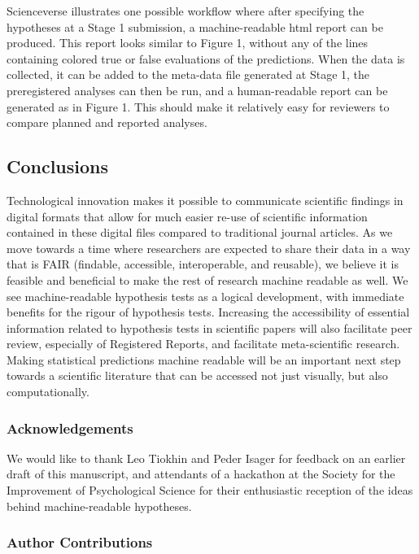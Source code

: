 \documentclass[english,doc,floatsintext]{apa6}
\begin{document}
Scienceverse illustrates one possible workflow where after specifying the hypotheses at a Stage 1 submission, a machine-readable html report can be produced. This report looks similar to Figure 1, without any of the lines containing colored true or false evaluations of the predictions. When the data is collected, it can be added to the meta-data file generated at Stage 1, the preregistered analyses can then be run, and a human-readable report can be generated as in Figure 1. This should make it relatively easy for reviewers to compare planned and reported analyses.

\hypertarget{conclusions}{%
\subsection{Conclusions}\label{conclusions}}

Technological innovation makes it possible to communicate scientific findings in digital formats that allow for much easier re-use of scientific information contained in these digital files compared to traditional journal articles. As we move towards a time where researchers are expected to share their data in a way that is FAIR (findable, accessible, interoperable, and reusable), we believe it is feasible and beneficial to make the rest of research machine readable as well. We see machine-readable hypothesis tests as a logical development, with immediate benefits for the rigour of hypothesis tests. Increasing the accessibility of essential information related to hypothesis tests in scientific papers will also facilitate peer review, especially of Registered Reports, and facilitate meta-scientific research. Making statistical predictions machine readable will be an important next step towards a scientific literature that can be accessed not just visually, but also computationally.

\newpage

\hypertarget{acknowledgements}{%
\subsubsection{Acknowledgements}\label{acknowledgements}}

We would like to thank Leo Tiokhin and Peder Isager for feedback on an earlier draft of this manuscript, and attendants of a hackathon at the Society for the Improvement of Psychological Science for their enthusiastic reception of the ideas behind machine-readable hypotheses.

\hypertarget{author-contributions}{%
\subsubsection{Author Contributions}\label{author-contributions}}
\end{document}
